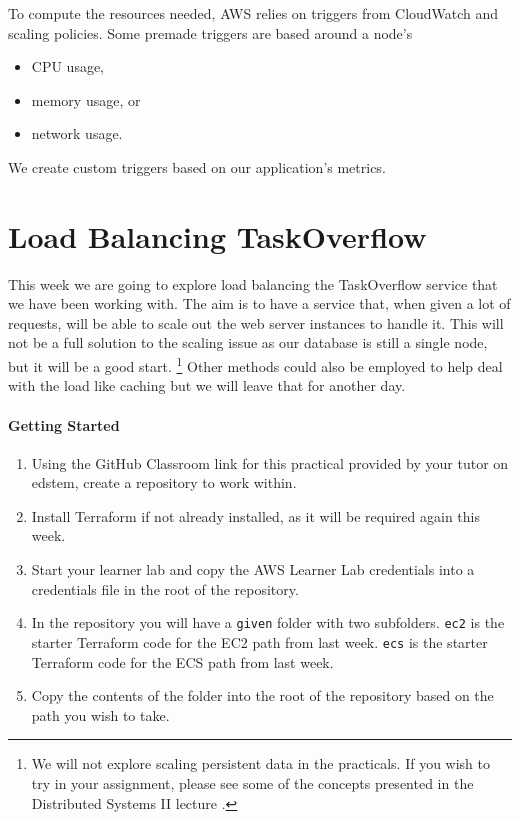 \documentclass{csse4400}
\begin{document}
To compute the resources needed, AWS relies on triggers from CloudWatch and scaling policies.
Some premade triggers are based around a node's

\begin{itemize}
    \item CPU usage,
    \item memory usage, or 
    \item network usage.
\end{itemize}

We create custom triggers based on our application's metrics.

\section{Load Balancing TaskOverflow}

This week we are going to explore load balancing the TaskOverflow service that we have been working with.
The aim is to have a service that, when given a lot of requests,
will be able to scale out the web server instances to handle it.
This will not be a full solution to the scaling issue as our database is still a single node,
but it will be a good start.%
\footnote{We will not explore scaling persistent data in the practicals.
If you wish to try in your assignment,
please see some of the concepts presented in the Distributed Systems II lecture \cite{distributed2-slides}.}
Other methods could also be employed to help deal with the load like caching but we will leave that for another day.

\paragraph{Getting Started}
\begin{enumerate}
    \item Using the GitHub Classroom link for this practical provided by your tutor on edstem,
create a repository to work within.
    \item Install Terraform if not already installed, as it will be required again this week.
    \item Start your learner lab and copy the AWS Learner Lab credentials into a credentials file in the root of the repository.
    \item In the repository you will have a \texttt{given} folder with two subfolders.
        \texttt{ec2} is the starter Terraform code for the EC2 path from last week.
        \texttt{ecs} is the starter Terraform code for the ECS path from last week.
    \item Copy the contents of the folder into the root of the repository based on the path you wish to take.
\end{enumerate}
\end{document}
